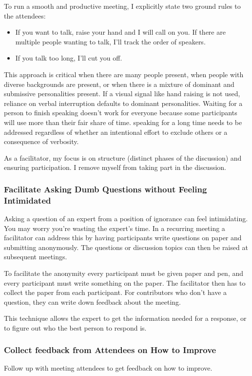 To run a smooth and productive meeting, I explicitly state two ground rules to the attendees:
\begin{itemize}
    \item If you want to talk, raise your hand and I will call on you. If there are multiple people wanting to talk, I'll track the order of speakers.
    \item If you talk too long, I'll cut you off. 
\end{itemize}
This approach is critical when there are many people present, when people with diverse backgrounds are present, or when there is a mixture of dominant and submissive personalities present. 
If a visual signal like hand raising is not used, reliance on verbal interruption defaults to dominant personalities. Waiting for a person to finish speaking doesn't work for everyone because some participants will use more than their fair share of time. speaking for a long time needs to be addressed regardless of whether an intentional effort to exclude others or a consequence of verbosity.

As a facilitator, my focus is on structure (distinct phases of the discussion) and ensuring participation. I remove myself from taking part in the discussion.

\subsubsection{Facilitate Asking Dumb Questions without Feeling Intimidated}

Asking a question of an expert from a position of ignorance can feel intimidating. You may worry you're wasting the expert's time. In a recurring meeting a facilitator can address this by having participants write questions on paper and submitting anonymously. The questions or discussion topics can then be raised at subsequent meetings. 

To facilitate the anonymity every participant must be given paper and pen, and every participant must write something on the paper. The facilitator then has to collect the paper from each participant. For contributors who don't have a question, they can write down feedback about the meeting. 

This technique allows the expert to get the information needed for a response, or to figure out who the best person to respond is. 

\subsubsection{Collect feedback from Attendees on How to Improve}

Follow up with meeting attendees to get feedback on how to improve.